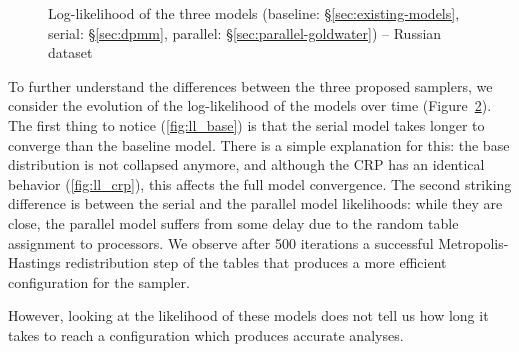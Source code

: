 \begin{figure}[h]
\begin{subfigure}{0.48\textwidth}
        \label{fig:ll_full}
    \end{subfigure}
    \caption{Log-likelihood of the three models (baseline: \S\ref{sec:existing-models}, serial: \S\ref{sec:dpmm}, parallel: \S\ref{sec:parallel-goldwater}) -- Russian dataset}
    \label{fig:ll}
\end{figure}


To further understand the differences between the three proposed samplers, we consider the evolution of the log-likelihood of the models over time (Figure~\ref{fig:ll}). The first thing to notice (\ref{fig:ll_base}) is that the serial model takes longer to converge than the baseline model. There is a simple explanation for this: the base distribution is not collapsed anymore, and although the CRP has an identical behavior (\ref{fig:ll_crp}), this affects the full model convergence. The second striking difference is between the serial and the parallel model likelihoods: while they are close, the parallel model suffers from some delay due to the random table assignment to processors. We observe after 500 iterations a successful Metropolis-Hastings redistribution step of the tables that produces a more efficient configuration for the sampler.

However, looking at the likelihood of these models does not tell us how long it takes to reach a configuration which produces accurate analyses.
